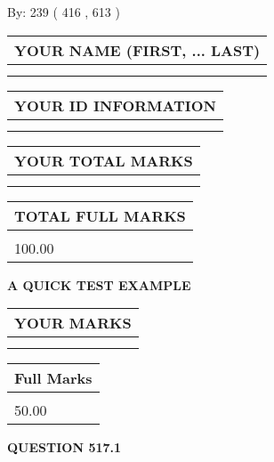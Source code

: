 \documentclass[12pt]{article}
\begin{document}
   
\hspace{1.0in} By: 
 239 ( 416 ,  613 )
   
   
   
   
\newpage 
\setcounter{page}{ 
   517001 } 
   
   
   
   
\noindent\begin{tabular}{|l|}
\hline
YOUR NAME (FIRST, ... LAST)  \\
\hline
 \\ 
 \\ 
\hline
\end{tabular}
\hspace{0.05in} \begin{tabular}{|l|}
\hline
 YOUR   ID   INFORMATION  \\
\hline
 \\ 
 \\ 
\hline
\end{tabular}
   
   
\vspace{0.2in}\noindent\begin{tabular}{|l|}
\hline
YOUR TOTAL MARKS  \\
\hline
 \\ 
 \\ 
\hline
\end{tabular}
\hspace{0.05in} \begin{tabular}{|l|}
\hline
TOTAL FULL MARKS  \\
\hline
 \\ 
100.00 \\
\hline
\end{tabular}
   
   
 \vspace{0.2in}
{\LARGE {\textbf{ A QUICK TEST EXAMPLE}}}
   
   
  
\vspace{0.2in}
  
\noindent\begin{tabular}{|l|}
\hline
 YOUR MARKS  \\
\hline
 \\ 
 \\ 
\hline
\end{tabular}
\hspace{0.05in} \begin{tabular}{|l|}
\hline
 Full Marks  \\
\hline
 \\ 
50.00 \\
\hline
\end{tabular}
{\textbf{\Large{QUESTION
517.1 
}}}
  
\end{document}
